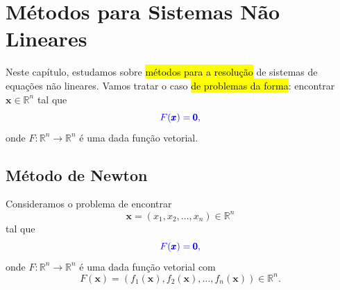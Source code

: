 
\chapter{Métodos para Sistemas Não Lineares}\label{cap_snl}
\thispagestyle{fancy}

Neste capítulo, estudamos sobre \hl{métodos para a resolução} de sistemas de equações não lineares. Vamos tratar o caso \hl{de problemas da forma}: encontrar $\pmb{x}\in\mathbb{R}^n$ tal que
\begin{equation}\color{blue}F(\pmb{x}) = \pmb{0},
\end{equation}
onde $F:\mathbb{R}^n\to\mathbb{R}^n$ é uma dada função vetorial.

\section{Método de Newton}\label{cap_snl_sec_newton}

Consideramos o problema de encontrar
\begin{equation}
  \pmb{x} = (x_1, x_2, \dotsc, x_n)\in\mathbb{R}^n
\end{equation}
tal que
\begin{equation}\label{cap_snl_sec_newton:eq:prob0}\color{blue}F(\pmb{x}) = \pmb{0},
\end{equation}
onde $F:\mathbb{R}^n\to\mathbb{R}^n$ é uma dada função vetorial com
\begin{equation}
  F(\pmb{x}) = (f_1(\pmb{x}), f_2(\pmb{x}), \dotsc, f_n(\pmb{x}))\in\mathbb{R}^n.
\end{equation}

